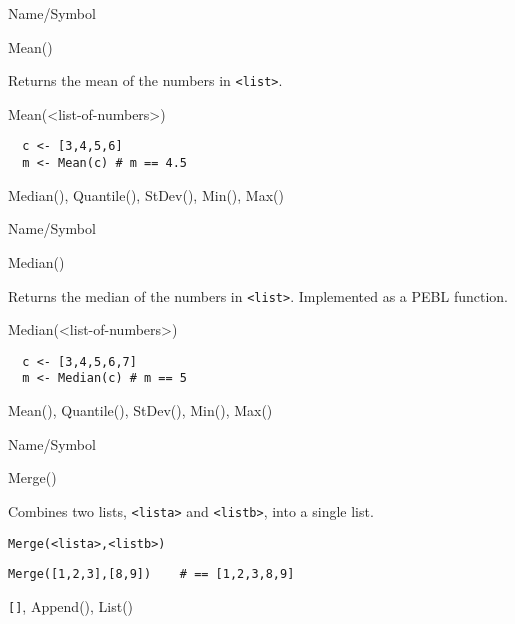 \rl





\begin{desc}{Name/Symbol}
\item[Name/Symbol]	Mean()

\item[Description] 	Returns the mean of the numbers in \verb+<list>+.

\item[Usage]	Mean(<list-of-numbers>)	

\item[Example]	
\begin{verbatim} 
  c <- [3,4,5,6]
  m <- Mean(c) # m == 4.5
\end{verbatim}

\item[See Also]	Median(), Quantile(), StDev(), Min(), Max()
\end{desc}

\rl



\begin{desc}{Name/Symbol}
\item[Name/Symbol]	Median()

\item[Description]	Returns the median of the numbers in
  \verb+<list>+.  Implemented as a PEBL function.

\item[Usage]	Median(<list-of-numbers>)

\item[Example]	
  \begin{verbatim} 
  c <- [3,4,5,6,7]
  m <- Median(c) # m == 5
\end{verbatim}
\item[See Also]	Mean(), Quantile(), StDev(), Min(), Max()
\end{desc}

\rl


\begin{desc}{Name/Symbol}
\item[Name/Symbol]	Merge()

\item[Description]	Combines two lists, \verb+<lista>+ and \verb+<listb>+, into a single list.

\item[Usage]		
\begin{verbatim}
Merge(<lista>,<listb>)
\end{verbatim}

\item[Example]	
\begin{verbatim}
Merge([1,2,3],[8,9]) 	# == [1,2,3,8,9]
\end{verbatim}

\item[See Also]	\verb+[]+, Append(), List()
\end{desc}

